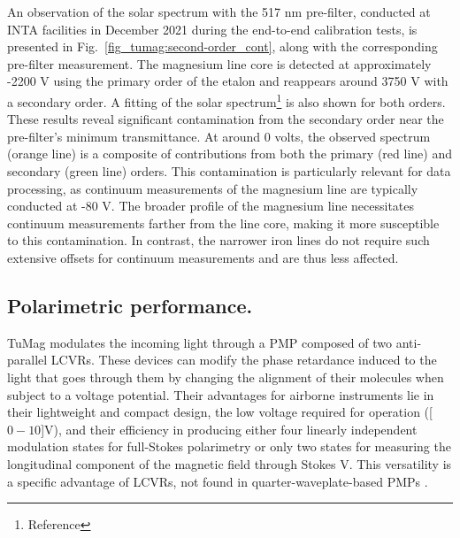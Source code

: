 An observation of the solar spectrum with the 517 nm pre-filter, conducted at INTA facilities in December 2021 during the end-to-end calibration tests, is presented in Fig.~\ref{fig_tumag:second-order_cont}, along with the corresponding pre-filter measurement. The magnesium line core is detected at approximately -2200 V using the primary order of the etalon and reappears around 3750 V with a secondary order. A fitting of the solar spectrum\footnote{Reference} is also shown for both orders. These results reveal significant contamination from the secondary order near the pre-filter's minimum transmittance. At around 0 volts, the observed spectrum (orange line) is a composite of contributions from both the primary (red line) and secondary (green line) orders. This contamination is particularly relevant for data processing, as continuum measurements of the magnesium line are typically conducted at -80 V. The broader profile of the magnesium line necessitates continuum measurements farther from the line core, making it more susceptible to this contamination. In contrast, the narrower iron lines do not require such extensive offsets for continuum measurements and are thus less affected.

\subsection{\label{sect:intro polarimetric}Polarimetric performance.}

TuMag modulates the incoming light through a PMP composed of two anti-parallel LCVRs. These devices can modify the phase retardance induced to the light that goes through them by changing the alignment of their molecules when subject to a voltage potential. Their advantages for airborne instruments lie in their lightweight and compact design, the low voltage required for operation ([$0 - 10$]V), and their efficiency in producing either four linearly independent modulation states for full-Stokes polarimetry or only two states for measuring the longitudinal component of the magnetic field through Stokes V. This versatility is a specific advantage of LCVRs, not found in quarter-waveplate-based PMPs \citep{pmp-advantages}.

